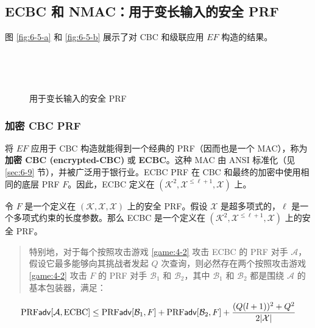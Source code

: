 \subsection{ECBC 和 NMAC：用于变长输入的安全 PRF}\label{subsec:6-5-1}

图 \ref{fig:6-5-a} 和 \ref{fig:6-5-b} 展示了对 CBC 和级联应用 $EF$ 构造的结果。

\begin{figure}
  \centering
  
  \,
  
  \,
  
  \caption{用于变长输入的安全 PRF}
\end{figure}

\subsubsection{加密 CBC PRF}

将 $EF$ 应用于 CBC 构造就能得到一个经典的 PRF（因而也是一个 MAC），称为\textbf{加密 CBC (encrypted-CBC)} 或 \textbf{ECBC}。这种 MAC 由 ANSI 标准化（见 \ref{sec:6-9} 节），并被广泛用于银行业。ECBC PRF 在 CBC 和最终的加密中使用相同的底层 PRF $F$。因此，ECBC 定义在 $(\mathcal{K}^2,\mathcal{X}^{\leq\ell+1},\mathcal{X})$ 上。

\begin{theorem}\label{theo:6-6}
令 $F$ 是一个定义在 $(\mathcal{K},\mathcal{X},\mathcal{X})$ 上的安全 PRF。假设 $\mathcal{X}$ 是超多项式的，$\ell$ 是一个多项式约束的长度参数。那么 ECBC 是一个定义在 $(\mathcal{K}^2,\mathcal{X}^{\leq\ell+1},\mathcal{X})$ 上的安全 PRF。
\begin{quote}
特别地，对于每个按照攻击游戏 \ref{game:4-2} 攻击 ECBC 的 PRF 对手 $\mathcal{A}$，假设它最多能够向其挑战者发起 $Q$ 次查询，则必然存在两个按照攻击游戏 \ref{game:4-2} 攻击 $F$ 的 PRF 对手 $\mathcal{B}_1$ 和 $\mathcal{B}_2$，其中 $\mathcal{B}_1$ 和 $\mathcal{B}_2$ 都是围绕 $\mathcal{A}$ 的基本包装器，满足：
\end{quote}
\begin{equation}\label{eq:6-19}
{\rm PRF}\mathsf{adv}[\mathcal{A},{\rm ECBC}]\leq{\rm PRF}\mathsf{adv}[\mathcal{B}_1,F]+{\rm PRF}\mathsf{adv}[\mathcal{B}_2,F]+\frac{(Q(l+1))^2+Q^2}{2|\mathcal{X}|}
\end{equation}
\end{theorem}

